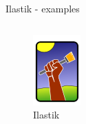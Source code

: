 \documentclass{beamer}
\begin{document}
\begin{frame}[noframenumbering]{Ilastik - examples}
\begin{columns}[T]
\begin{column}{.2\textwidth}
\begin{figure}[!ht]
\includegraphics[width=\textwidth]{Ilastik.png}
\caption{Ilastik}
\label{}
\end{figure}
\end{column}%
\end{columns}
\end{frame}
\end{document}
